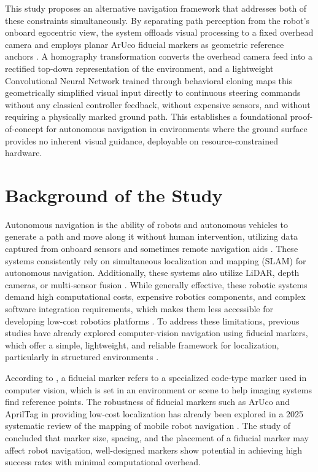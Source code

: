This study proposes an alternative navigation framework that addresses both of these constraints simultaneously. By separating path perception from the robot's onboard egocentric view, the system offloads visual processing to a fixed overhead camera and employs planar ArUco fiducial markers as geometric reference anchors \citep{Debeunne2020Review}. A homography transformation converts the overhead camera feed into a rectified top-down representation of the environment, and a lightweight Convolutional Neural Network trained through behavioral cloning maps this geometrically simplified visual input directly to continuous steering commands without any classical controller feedback, without expensive sensors, and without requiring a physically marked ground path. This establishes a foundational proof-of-concept for autonomous navigation in environments where the ground surface provides no inherent visual guidance, deployable on resource-constrained hardware.
\section{Background of the Study}

Autonomous navigation is the ability of robots and autonomous vehicles to generate a path and move along it without human intervention, utilizing data captured from onboard sensors and sometimes remote navigation aids \cite{Cebollada2020MobileRoboticsAI}. These systems consistently rely on simultaneous localization and mapping (SLAM) for autonomous navigation. Additionally, these systems also utilize LiDAR, depth cameras, or multi-sensor fusion \cite{Liu2024IndoorSensingReview, Wei2024SLAMResearchReview, Zhu2023CameraLidarIMUFusionSLAMSurvey}. While generally effective, these robotic systems demand high computational costs, expensive robotics components, and complex software integration requirements, which makes them less accessible for developing low-cost robotics platforms \cite{Chea2023CollaborativeConstructionRobot}. To address these limitations, previous studies have already explored computer-vision navigation using fiducial markers, which offer a simple, lightweight, and reliable framework for localization, particularly in structured environments \cite{Alghamdi2025MobileRobotMarkersMapping}.

According to \cite{kuzmenko2025fiducial}, a fiducial marker refers to a specialized code-type marker used in computer vision, which is set in an environment or scene to help imaging systems find reference points. The robustness of fiducial markers such as ArUco and AprilTag in providing low-cost localization has already been explored in a 2025 systematic review of the mapping of mobile robot navigation \cite{Alghamdi2025MobileRobotMarkersMapping}. The study of \cite{Mantha2022FiducialNetworkNavigation} concluded that marker size, spacing, and the placement of a fiducial marker may affect robot navigation, well-designed markers show potential in achieving high success rates with minimal computational overhead. 

